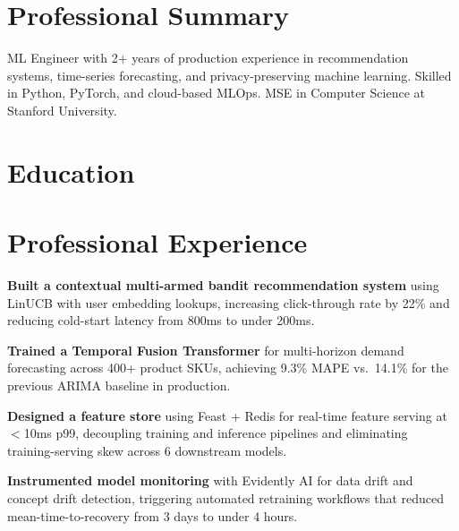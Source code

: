 %

\section{Professional Summary}

ML Engineer with 2+ years of production experience in recommendation systems, time-series forecasting, and privacy-preserving machine learning. Skilled in Python, PyTorch, and cloud-based MLOps. MSE in Computer Science at Stanford University.

\section{Education}



\section{Professional Experience}

\begin{rlist}
  \item \textbf{Built a contextual multi-armed bandit recommendation system} using LinUCB with user embedding lookups, increasing click-through rate by 22\% and reducing cold-start latency from 800ms to under 200ms.
  \item \textbf{Trained a Temporal Fusion Transformer} for multi-horizon demand forecasting across 400+ product SKUs, achieving 9.3\% MAPE vs.\ 14.1\% for the previous ARIMA baseline in production.
  \item \textbf{Designed a feature store} using Feast + Redis for real-time feature serving at $<$10ms p99, decoupling training and inference pipelines and eliminating training-serving skew across 6 downstream models.
  \item \textbf{Instrumented model monitoring} with Evidently AI for data drift and concept drift detection, triggering automated retraining workflows that reduced mean-time-to-recovery from 3 days to under 4 hours.
\end{rlist}

